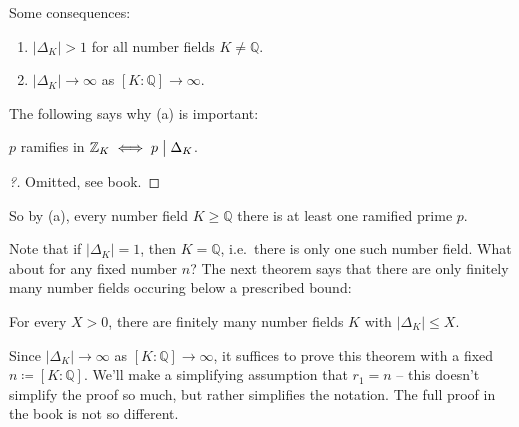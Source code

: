 \begin{remark}

Some consequences:

\begin{enumerate}
\def\labelenumi{\alph{enumi}.}
\tightlist
\item
  \({\left\lvert {{\Delta}_K} \right\rvert} > 1\) for all number fields
  \(K\neq {\mathbb{Q}}\).
\item
  \({\left\lvert {{\Delta}_K} \right\rvert}\to\infty\) as
  \([K:{\mathbb{Q}}]\to\infty\).
\end{enumerate}

The following says why (a) is important:

\end{remark}

\begin{theorem}[Dedekind]

\(p\) ramifies in \({\mathbb{Z}}_K \iff p \bigm|{\Delta}_K\).

\end{theorem}

\begin{proof}[?]

Omitted, see book.

\end{proof}

\begin{remark}

So by (a), every number field \(K\geq {\mathbb{Q}}\) there is at least
one ramified prime \(p\).

\end{remark}

\begin{remark}

Note that if \({\left\lvert {{\Delta}_K} \right\rvert} = 1\), then
\(K={\mathbb{Q}}\), i.e.~there is only one such number field. What about
for any fixed number \(n\)? The next theorem says that there are only
finitely many number fields occuring below a prescribed bound:

\end{remark}

\begin{theorem}

For every \(X>0\), there are finitely many number fields \(K\) with
\({\left\lvert {{\Delta}_K} \right\rvert} \leq X\).

\end{theorem}

\begin{remark}

Since \({\left\lvert {{\Delta}_K} \right\rvert}\to\infty\) as
\([K:{\mathbb{Q}}]\to\infty\), it suffices to prove this theorem with a
fixed \(n\coloneqq[K: {\mathbb{Q}}]\). We'll make a simplifying
assumption that \(r_1 = n\) -- this doesn't simplify the proof so much,
but rather simplifies the notation. The full proof in the book is not so
different.

\end{remark}

